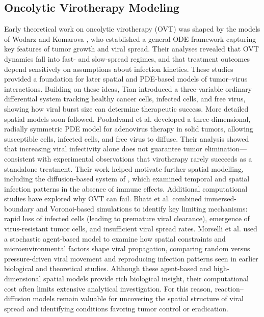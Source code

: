 \documentclass[11pt]{article}
\theoremstyle{definition}
\begin{document}
\subsection{Oncolytic Virotherapy Modeling}
Early theoretical work on oncolytic virotherapy (OVT) was shaped by the models of Wodarz and Komarova \cite{Woodarz2002,WodarzKamorva009,KomorovaWodarz2010}, who established a general ODE framework capturing key features of tumor growth and viral spread. Their analyses revealed that OVT dynamics fall into fast- and slow-spread regimes, and that treatment outcomes depend sensitively on assumptions about infection kinetics. These studies provided a foundation for later spatial and PDE-based models of tumor–virus interactions.
Building on these ideas, Tian \cite{Tian} introduced a three-variable ordinary differential system tracking healthy cancer cells, infected cells, and free virus, showing how viral burst size can determine therapeutic success. More detailed spatial models soon followed. Pooladvand et al.\cite{POOLADVAND2021108520} developed a three-dimensional, radially symmetric PDE model for adenovirus therapy in solid tumors, allowing susceptible cells, infected cells, and free virus to diffuse. Their analysis showed that increasing viral infectivity alone does not guarantee tumor elimination—consistent with experimental observations that virotherapy rarely succeeds as a standalone treatment. Their work helped motivate further spatial modelling, including the diffusion-based system of \cite{arwa}, which examined temporal and spatial infection patterns in the absence of immune effects.
Additional computational studies have explored why OVT can fail. Bhatt et al. \cite{BhattDarshakKartikey2022Mtsd} combined immersed-boundary and Voronoi-based simulations to identify key limiting mechanisms: rapid loss of infected cells (leading to premature viral clearance), emergence of virus-resistant tumor cells, and insufficient viral spread rates. Morselli et al. \cite{MorselliDavid2023AaCM} used a stochastic agent-based model to examine how spatial constraints and microenvironmental factors shape viral propagation, comparing random versus pressure-driven viral movement and reproducing infection patterns seen in earlier biological and theoretical studies.
Although these agent-based and high-dimensional spatial models provide rich biological insight, their computational cost often limits extensive analytical investigation. For this reason, reaction–diffusion models remain valuable for uncovering the spatial structure of viral spread and identifying conditions favoring tumor control or eradication.
\end{document}
